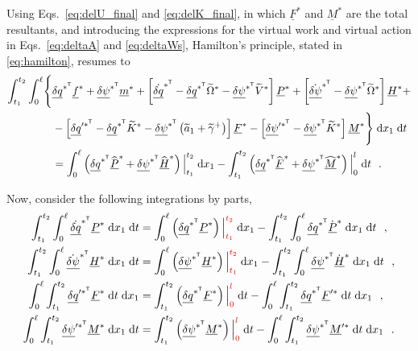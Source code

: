 \documentclass[12pt,a4paper,oneside,english]{abntex2} %
\newcommand{\fix}[1]{{\color{red}#1}}
\newcommand{\vect}[1]{\underline{#1}}
\def\til#1{\widetilde{#1}}
\def\lb{\left[}
\def\rb{\right]}
\def\lp{\left(}
\def\rp{\right)}
\def\T{\mathsf{T}}
\def\xo{x_1}
\def\aonetil{\til{a}_1}
\def\gamptil{\til{\gamma}^{+}}
\def\Ktil{\til{K}}
\def\Ktils{\Ktil^{*}}
\def\Vtils{\til{V}^{*}}
\def\Omtil{\til{\Omega}}
\def\Omtils{\Omtil^{*}}
\def\P{\vect{P}}
\def\Ps{\P^*}
\def\Pdots{\dot{\P}^*}
\def\Phats{\widehat{\P}^*}
\def\Hv{\vect{H}}
\def\Hvdot{\dot{\Hv}}
\def\Hvs{\Hv^*}
\def\Hvdots{\Hvdot^*}
\def\Hhats{\widehat{\Hv}^*}
\def\F{\vect{F}}
\def\Fhat{\widehat{\F}}
\def\Fhats{\Fhat^*}
\def\Fs{\F^*}
\def\Fsprime{\F^{\prime*}}
\def\M{\vect{M}}
\def\Mhat{\widehat{\M}}
\def\Mhats{\Mhat^*}
\def\Ms{\M^*}
\def\Msprime{\M^{\prime*}}
\def\f{\vect{f}}
\def\fs{\f^*}
\def\m{\vect{m}}
\def\ms{\m^*}
\def\delq{\vect{\delta q}}
\def\delqdotsT{\dot{\delq}^{*^\T}}
\def\delqsT{\delq^{*^\T}}
\def\delqpsT{\delq^{{\prime*}^\T}}
\def\delpsi{\vect{\delta\psi}}
\def\delpsisT{\delpsi^{*^\T}}
\def\delpsipsT{\delpsi^{\prime*^\T}}
\def\delpsidot{\dot{\delpsi}}
\def\delpsisdotT{\delpsidot^{*^\T}}
\def\intt{\int_{t_1}^{t_2}}
\def\intl{\int_{0}^{\ell}}
\def\d{\textnormal{d}}
\begin{document}
\begin{apendicesenv}
Using Eqs.~\eqref{eq:delU_final} and \eqref{eq:delK_final}\fix{, in which $\Fs$ and $\Ms$ are the total resultants,} and introducing the expressions for the virtual work and virtual action in Eqs.~\eqref{eq:deltaA} and \eqref{eq:deltaWs}, Hamilton's principle, stated in \cref{eq:hamilton}, resumes to
\begin{align}
    \intt\intl \Biggl\{\Biggr.&
    \delqsT\fs + \delpsisT\ms + \lb\delqdotsT - \delqsT\Omtils - \delpsisT\Vtils\rb\Ps + \lb\delpsisdotT - \delpsisT\Omtils\rb\Hvs + 
    \nonumber 
    \\
    &-\lb\delqpsT - \delqsT\Ktils - \delpsisT\lp\aonetil+\gamptil\rp\rb\Fs - \lb\delpsipsT - \delpsisT\Ktils\rb\Ms  \Biggl.\Biggr\} \;\d\xo\;\d t \nonumber \\
    &= \intl\lp \delqsT\Phats + \delpsisT\Hhats \rp\Big|_{t_1}^{t_2} \; \d \xo - \intt\lp  \delqsT\Fhats + \delpsisT\Mhats \rp\Big|_{0}^{l} \; \d t \ \ .
    \label{eq:hamilton_expanded}
\end{align}

Now, consider the following integrations by parts,
\begin{equation}
\begin{aligned}
    \intt\intl \delqdotsT\Ps \;\d\xo\;\d t &= \intl \lp \delqsT\Ps \rp\Big|_{\fix{t_1}}^{\fix{t_2}} \;\d\xo - \intt\intl \delqsT\Pdots \;\d\xo\;\d t \ \ , 
    \nonumber 
    \\
    \intt\intl \delpsisdotT\Hvs \;\d\xo\;\d t &= \intl \lp \delpsisT\Hvs \rp\Big|_{\fix{t_1}}^{\fix{t_2}} \;\d\xo - \intt\intl \delpsisT\Hvdots \;\d\xo\;\d t \ \ , 
    \nonumber 
    \\
    \intl\intt \delqpsT\Fs \;\d t\;\d\xo &= \intt \lp \delqsT\Fs \rp\Big|_{\fix{0}}^{\fix{l}} \;\d t - \intl\intt \delqsT\Fsprime \;\d t\;\d\xo \ \ , 
    \nonumber 
    \\
    \intl\intt \delpsipsT\Ms \;\d\xo\;\d t &= \intt \lp \delpsisT\Ms \rp\Big|_{\fix{0}}^{\fix{l}} \;\d t - \intl\intt \delpsisT\Msprime \;\d t\;\d\xo \ \ .
    \label{eq:int_parts}
\end{aligned}
\end{equation}


\end{apendicesenv}
\end{document}

